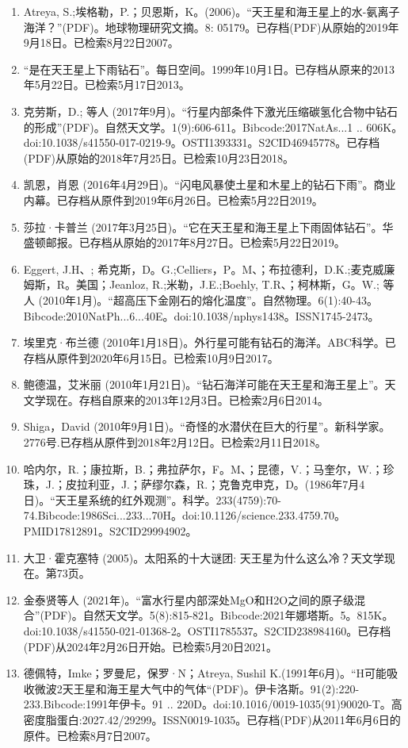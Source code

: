 \begin{enumerate}
\item Atreya, S.;埃格勒，P.；贝恩斯，K。(2006)。“天王星和海王星上的水-氨离子海洋？”(PDF)。地球物理研究文摘。8: 05179。已存档(PDF)从原始的2019年9月18日。已检索8月22日2007。
\item “是在天王星上下雨钻石”。每日空间。1999年10月1日。已存档从原来的2013年5月22日。已检索5月17日2013。
\item 克劳斯，D.; 等人 (2017年9月)。“行星内部条件下激光压缩碳氢化合物中钻石的形成”(PDF)。自然天文学。1(9):606-611。Bibcode:2017NatAs...1 .. 606K。doi:10.1038/s41550-017-0219-9。OSTI1393331。S2CID46945778。已存档(PDF)从原始的2018年7月25日。已检索10月23日2018。   
\item 凯恩，肖恩 (2016年4月29日)。“闪电风暴使土星和木星上的钻石下雨”。商业内幕。已存档从原件到2019年6月26日。已检索5月22日2019。
\item 莎拉·卡普兰 (2017年3月25日)。“它在天王星和海王星上下雨固体钻石”。华盛顿邮报。已存档从原始的2017年8月27日。已检索5月22日2019。
\item Eggert, J.H、; 希克斯，D。G.;Celliers，P。M、；布拉德利，D.K.;麦克威廉姆斯，R。美国；Jeanloz, R.;米勒，J.E.;Boehly, T.R、；柯林斯，G。W.; 等人 (2010年1月)。“超高压下金刚石的熔化温度”。自然物理。6(1):40-43。Bibcode:2010NatPh...6...40E。doi:10.1038/nphys1438。ISSN1745-2473。 
\item 埃里克·布兰德 (2010年1月18日)。外行星可能有钻石的海洋。ABC科学。已存档从原件到2020年6月15日。已检索10月9日2017。
\item 鲍德温，艾米丽 (2010年1月21日)。“钻石海洋可能在天王星和海王星上”。天文学现在。存档自原来的2013年12月3日。已检索2月6日2014。
\item Shiga，David (2010年9月1日)。“奇怪的水潜伏在巨大的行星”。新科学家。2776号.已存档从原件到2018年2月12日。已检索2月11日2018。
\item 哈内尔，R.；康拉斯，B.；弗拉萨尔，F。M、；昆德，V.；马奎尔，W.；珍珠，J.；皮拉利亚，J.；萨缪尔森，R.；克鲁克申克，D。(1986年7月4日)。“天王星系统的红外观测”。科学。233(4759):70-74.Bibcode:1986Sci...233...70H。doi:10.1126/science.233.4759.70。PMID17812891。S2CID29994902。   
\item 大卫·霍克塞特 (2005)。太阳系的十大谜团: 天王星为什么这么冷？天文学现在。第73页。
\item 金泰贤等人 (2021年)。“富水行星内部深处MgO和H2O之间的原子级混合”(PDF)。自然天文学。5(8):815-821。Bibcode:2021年娜塔斯。5。815K。doi:10.1038/s41550-021-01368-2。OSTI1785537。S2CID238984160。已存档(PDF)从2024年2月26日开始。已检索5月20日2021。   
\item 德佩特，Imke；罗曼尼，保罗·N；Atreya, Sushil K.(1991年6月)。“H可能吸收微波2天王星和海王星大气中的气体“(PDF)。伊卡洛斯。91(2):220-233.Bibcode:1991年伊卡。91 .. 220D。doi:10.1016/0019-1035(91)90020-T。高密度脂蛋白:2027.42/29299。ISSN0019-1035。已存档(PDF)从2011年6月6日的原件。已检索8月7日2007。  

\end{enumerate}

